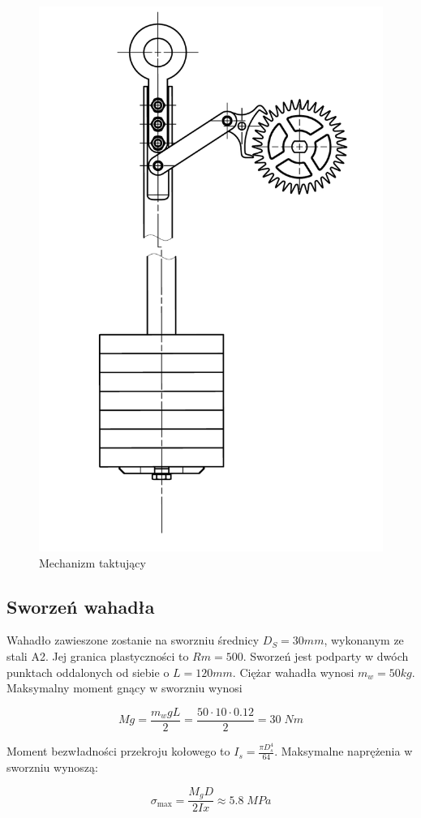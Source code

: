 			\begin{figure}[th]
				\centering
				\includegraphics[width=0.6\linewidth]{Projekt/takt}
				\caption{Mechanizm taktujący}
				\label{fig:takt}
			\end{figure}
			
		\subsection{Sworzeń wahadła}
		
		Wahadło zawieszone zostanie na sworzniu średnicy \(D_S = 30 mm\), wykonanym ze stali A2. Jej granica plastyczności to \(Rm = 500\). Sworzeń jest podparty w dwóch punktach oddalonych od siebie o \(L = 120 mm\). Ciężar wahadła wynosi \( m_w =50 kg\). Maksymalny moment gnący w sworzniu wynosi
		
		\begin{equation}
		Mg = \frac{m_w g L}{2} = \frac{50 \cdot 10 \cdot 0.12}{2} = 30\; Nm
		\end{equation}
			
Moment bezwładności przekroju kołowego to \(I_s = \frac{\pi D_s^4}{64}\). Maksymalne naprężenia w sworzniu wynoszą:

\begin{equation}
\sigma_{\max} = \frac{M_g D}{2Ix} \approx 5.8\; MPa
\end{equation}

